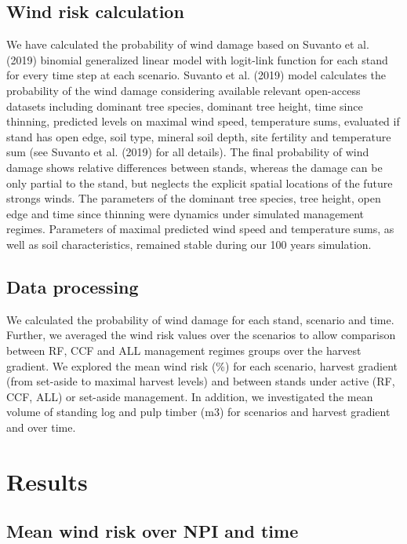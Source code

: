 \documentclass[]{elsarticle} %
\begin{document}
\hypertarget{wind-risk-calculation}{%
\subsection{Wind risk calculation}\label{wind-risk-calculation}}

We have calculated the probability of wind damage based on Suvanto et al. (2019) binomial generalized linear model with logit-link function for each stand for every time step at each scenario. Suvanto et al. (2019) model calculates the probability of the wind damage considering available relevant open-access datasets including dominant tree species, dominant tree height, time since thinning, predicted levels on maximal wind speed, temperature sums, evaluated if stand has open edge, soil type, mineral soil depth, site fertility and temperature sum (see Suvanto et al. (2019) for all details). The final probability of wind damage shows relative differences between stands, whereas the damage can be only partial to the stand, but neglects the explicit spatial locations of the future strongs winds. The parameters of the dominant tree species, tree height, open edge and time since thinning were dynamics under simulated management regimes. Parameters of maximal predicted wind speed and temperature sums, as well as soil characteristics, remained stable during our 100 years simulation.

\hypertarget{data-processing}{%
\subsection{Data processing}\label{data-processing}}

We calculated the probability of wind damage for each stand, scenario and time. Further, we averaged the wind risk values over the scenarios to allow comparison between RF, CCF and ALL management regimes groups over the harvest gradient. We explored the mean wind risk (\%) for each scenario, harvest gradient (from set-aside to maximal harvest levels) and between stands under active (RF, CCF, ALL) or set-aside management. In addition, we investigated the mean volume of standing log and pulp timber (m3) for scenarios and harvest gradient and over time.

\hypertarget{results}{%
\section{Results}\label{results}}

\hypertarget{mean-wind-risk-over-npi-and-time}{%
\subsection{Mean wind risk over NPI and time}\label{mean-wind-risk-over-npi-and-time}}
\end{document}
